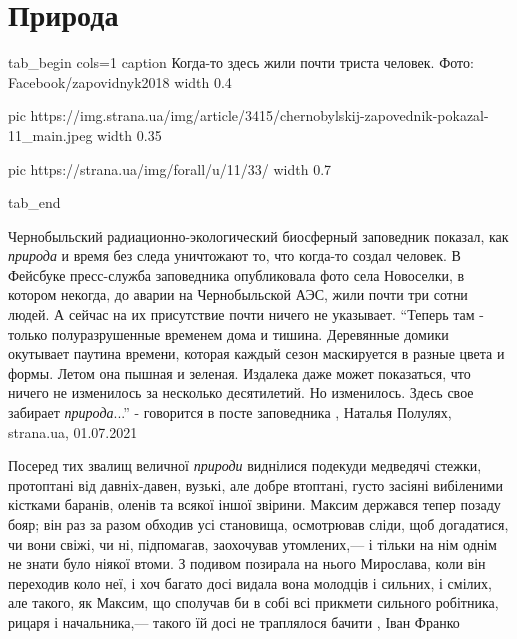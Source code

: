  
 
 
 
 
\chapter{Природа}
\label{sec:slova.priroda}


\ifcmt
  tab_begin cols=1
     caption Когда-то здесь жили почти триста человек. Фото: Facebook/zapovidnyk2018
     width 0.4

     pic https://img.strana.ua/img/article/3415/chernobylskij-zapovednik-pokazal-11_main.jpeg
     width 0.35

     pic https://strana.ua/img/forall/u/11/33/%
     width 0.7

  tab_end
\fi

Чернобыльский радиационно-экологический биосферный заповедник показал,
как \emph{природа} и время без следа уничтожают то, что когда-то создал человек.  В
Фейсбуке пресс-служба заповедника опубликовала фото села Новоселки, в котором
некогда, до аварии на Чернобыльской АЭС, жили почти три сотни людей. А сейчас
на их присутствие почти ничего не указывает. \enquote{Теперь там - только
полуразрушенные временем дома и тишина. Деревянные домики окутывает паутина
времени, которая каждый сезон маскируется в разные цвета и формы. Летом она
пышная и зеленая. Издалека даже может показаться, что ничего не изменилось за
несколько десятилетий. Но изменилось. Здесь свое забирает \emph{природа}...} -
говорится в посте заповедника
, 
Наталья Полулях, strana.ua, 01.07.2021

Посеред тих звалищ величної \emph{природи} виднілися подекуди медведячі стежки,
протоптані від давніх-давен, вузькі, але добре втоптані, густо засіяні
вибіленими кістками баранів, оленів та всякої іншої звірини. Максим держався
тепер позаду бояр; він раз за разом обходив усі становища, осмотрював сліди,
щоб догадатися, чи вони свіжі, чи ні, підпомагав, заохочував утомлених,— і
тільки на нім однім не знати було ніякої втоми. З подивом позирала на нього
Мирослава, коли він переходив коло неї, і хоч багато досі видала вона молодців
і сильних, і смілих, але такого, як Максим, що сполучав би в собі всі прикмети
сильного робітника, рицаря і начальника,— такого їй досі не траплялося бачити
, Іван Франко

